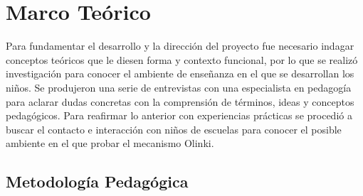 \documentclass[letterpaper,10pt]{article}
\begin{document}
\section{Marco Teórico}

Para fundamentar el desarrollo y la dirección del proyecto fue necesario indagar conceptos
teóricos que le diesen forma y contexto funcional, por lo que se realizó 
investigación para conocer el ambiente de enseñanza en el que se desarrollan los niños.
Se produjeron una serie de entrevistas con una especialista en pedagogía para
aclarar dudas concretas con  la comprensión de términos, ideas y conceptos pedagógicos.
Para reafirmar lo anterior con experiencias prácticas se procedió a buscar el contacto e
interacción con niños de escuelas para conocer el posible ambiente en el que probar el
mecanismo Olinki.\newline


\subsection{Metodología Pedagógica}
\end{document}

